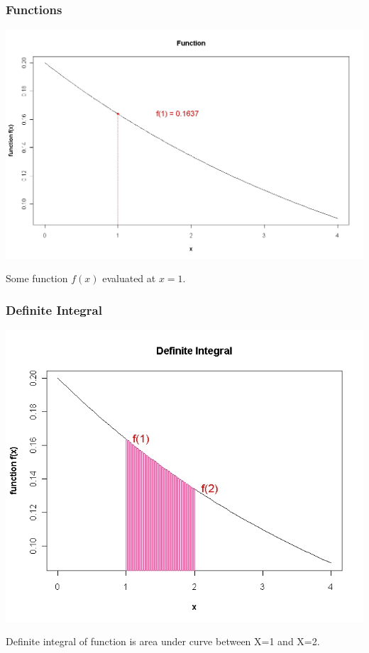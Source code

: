 \begin{frame}
\frametitle{Functions}

\vspace{-0.5cm}

\begin{center}
\includegraphics[scale=0.30]{images/6AFunction}

\end{center}

Some function $f(x)$ evaluated at $x=1$.
\end{frame}
\begin{frame}
\frametitle{Definite Integral}

\vspace{-0.5cm}
\begin{center}
\includegraphics[scale=0.35]{images/6ADefiniteIntegral}
\end{center}
Definite integral of function is area under curve between X=1 and X=2.
\end{frame}



